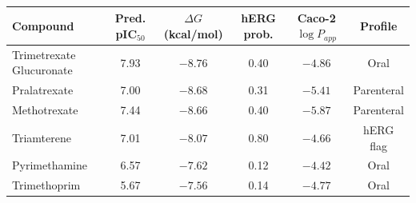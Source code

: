 \begin{tabularx}{\textwidth}{>{\raggedright\arraybackslash}Xccccc}
\toprule
\textbf{Compound} & \textbf{Pred. pIC$_{50}$} & \textbf{$\Delta G$ (kcal/mol)} & \textbf{hERG prob.} & \textbf{Caco-2 $\log P_{app}$} & \textbf{Profile} \\
\midrule
Trimetrexate Glucuronate & 7.93 & $-8.76$ & 0.40 & $-4.86$ & Oral \\
Pralatrexate & 7.00 & $-8.68$ & 0.31 & $-5.41$ & Parenteral \\
Methotrexate & 7.44 & $-8.66$ & 0.40 & $-5.87$ & Parenteral \\
Triamterene & 7.01 & $-8.07$ & 0.80 & $-4.66$ & hERG flag \\
Pyrimethamine & 6.57 & $-7.62$ & 0.12 & $-4.42$ & Oral \\
Trimethoprim & 5.67 & $-7.56$ & 0.14 & $-4.77$ & Oral \\
\bottomrule
\end{tabularx}
